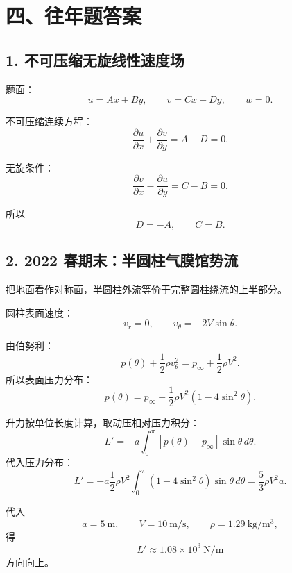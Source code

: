 \documentclass[UTF8,zihao=-4]{ctexart}
\begin{document}
\section*{四、往年题答案}

\subsection*{1. 不可压缩无旋线性速度场}

题面：
\[
u=Ax+By,\qquad v=Cx+Dy,\qquad w=0.
\]

不可压缩连续方程：
\[
\frac{\partial u}{\partial x}+\frac{\partial v}{\partial y}=A+D=0.
\]

无旋条件：
\[
\frac{\partial v}{\partial x}-\frac{\partial u}{\partial y}=C-B=0.
\]

所以
\[
\boxed{D=-A,\qquad C=B.}
\]

\subsection*{2. 2022 春期末：半圆柱气膜馆势流}

把地面看作对称面，半圆柱外流等价于完整圆柱绕流的上半部分。

圆柱表面速度：
\[
v_r=0,\qquad v_\theta=-2V\sin\theta.
\]

由伯努利：
\[
p(\theta)+\frac12\rho v_\theta^2
=p_\infty+\frac12\rho V^2.
\]
所以表面压力分布：
\[
\boxed{
p(\theta)=p_\infty+\frac12\rho V^2(1-4\sin^2\theta)
}.
\]

升力按单位长度计算，取动压相对压力积分：
\[
L'=-a\int_0^\pi [p(\theta)-p_\infty]\sin\theta\,d\theta.
\]
代入压力分布：
\[
L'
=-a\frac12\rho V^2
\int_0^\pi (1-4\sin^2\theta)\sin\theta\,d\theta
=\frac53\rho V^2a.
\]

代入
\[
a=5\ \mathrm{m},\qquad V=10\ \mathrm{m/s},\qquad \rho=1.29\ \mathrm{kg/m^3},
\]
得
\[
\boxed{
L'\approx1.08\times10^3\ \mathrm{N/m}
}
\]
方向向上。
\end{document}
